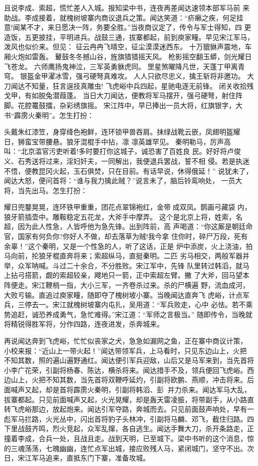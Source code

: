 且说李成、索超，慌忙差人入城。报知梁中书，连夜再差闻达速领本部军马前
来助战。李成接着，就槐树坡寨内商议退兵之策。闻达笑道：“疥癞之疾，何足挂
意!闻某不才，来日愿决一阵，务要全胜。”当夜商议定了，传令与军士得知，四
更造饭，五更披挂，平明进兵。战鼓三通，拔寨都起，前到庾家疃。早见宋江军马，
泼风也似价来。但见：
征云冉冉飞晴空，征尘漠漠迷西东。
十万貔貅声震地，车厢火炮如雷轰。
鼙鼓冬冬撼山谷，旌旗猎猎摇天风。
枪影摇空翻玉蟒，剑光耀日飞苍龙。
六师鹰扬鬼神泣，三军英勇貅虎同。
罡星煞曜降凡世，天蓬丁甲离青穹。
银盔金甲濯冰雪，强弓硬弩真难攻。
人人只欲尽忠义，擒王斩将非邀功。
大刀闻达不知量，狂言逞技真雕虫!
飞虎峪中兵四起，星驰电逐无前锋。
闭关收拾残戈甲，有如脱兔潜葭蓬。
当日大刀闻达，便教将军马摆开，强弓硬弩，射住阵脚。花腔鼍鼓擂，杂彩绣旗摇。
宋江阵中，早已捧出一员大将，红旗银字，大书“霹雳火秦明”。怎生打扮：

头戴朱红漆笠，身穿绛色袍鲜，连环锁甲兽吞肩。抹绿战靴云嵌，凤翅明盔耀
日，狮蛮宝带腰悬。狼牙混棍手中拈，凛
凛英雄罕见。
秦明勒马，厉声高叫：“北京滥官污吏听着!多时要打你这城子，诚恐害了百姓良
民。好好将卢俊义、石秀送将过来，淫妇奸夫，一同解出，我便退兵罢战，誓不相
侵。若是执迷不悟，便教昆冈火起，玉石俱焚，只在目前。有话早说，休得俄延！”
说犹未了，闻达大怒，便问首将：“谁与我力擒此贼？”说言未了，脑后铃鸾响处，
一员大将，当先出马。怎生打扮：

耀日兜鍪晃晃，连环铁甲重重，团花点翠锦袍红，金带成双凤。鹊画弓藏袋
内，狼牙箭插壶中。雕鞍稳定五花龙，大斧手中摩弄。
这个是北京上将，姓索，名超，因为此人性急，人皆呼他为急先锋。出到阵前，高
声喝道：“你这厮是朝廷命官，国家有何负你?你好人不做，却去落草为贼!我今拿
住你时，碎尸万段，死有余辜！”这个秦明，又是一个性急的人，听了这话，正是
炉中添炭，火上浇油，拍马向前，抡狼牙棍直奔将来；索超纵马，直挺秦明。二匹
劣马相交，两般军器并举，众军呐喊。斗过二十余合，不分胜败。宋江军中，先锋
队里转过韩滔，就马上拈弓搭箭，觑的索超较亲，飕地只一箭，正中索超左臂。撇
了大斧，回马望本阵便走。宋江鞭梢一指，大小三军，一齐卷杀过来。杀的尸横遍
野，流血成河，大败亏输。直追过庾家疃，随即夺了槐树坡小寨。当晚闻达直奔飞
虎峪，计点军兵，三停去一。宋江就槐树坡寨内屯扎，吴用道：“军兵败走，心中
必怯。若不乘势追赶，诚恐养成勇气，急忙难得。”宋江道：“军师之言极当。”
随即传令，当晚就将精锐得胜军将，分作四路，连夜进发，杀奔城来。

再说闻达奔到飞虎峪，忙忙似丧家之犬，急急如漏网之鱼，正在寨中商议计策，
小校来报：“近山上一带火起！”闻达带领军兵，上马看时，只见东边山上，火把
不知其数，照的遍山遍野通红。闻达便引军兵迎敌，山后又是马军来到，当先首将
小李广花荣，引副将杨春、陈达，横杀将来。闻达措手不及，领兵便回飞虎峪。西
边山上，火把不知其数，当先首将双鞭呼延灼，引副将欧鹏、燕顺，冲击将来。后
面喊声又起，却是首将霹雳火秦明，引副将韩滔、彭，并力杀来。闻达军马大乱，
拔寨都起。只见前面喊声又起，火光晃耀，却是轰天雷凌振，将带副手，从小路直
转飞虎峪那边，放起炮来。闻达引军夺路，奔城而去。只见前面鼓声响处，早有一
彪军马拦路，火光丛中，闪出首将豹子头林冲，引副将马麟、邓飞，截住归路。四
下里战鼓齐鸣，烈火竞起，众军乱撺，各自逃生。闻达手舞大刀，杀开条路走，正
撞着李成，合兵一处，且战且走。战到天明，已至城下。梁中书听的这个消息，惊
的三魂荡荡，七魄幽幽，连忙点军出城，接应败残人马，紧闭城门，坚守不出。次
日，宋江军马追来，直抵东门下寨，准备攻城。

